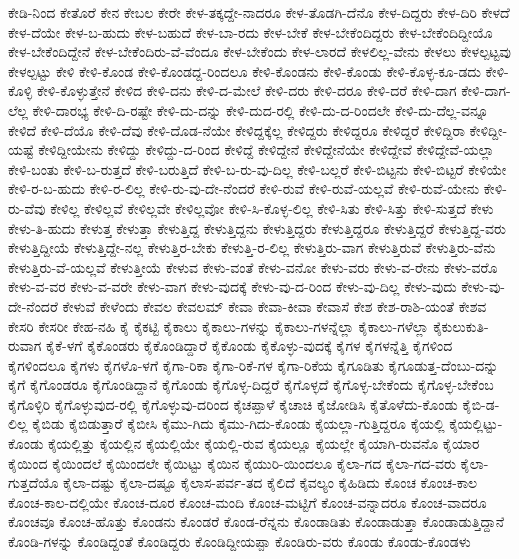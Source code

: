 {ಕೇಡಿ-ನಿಂದ
ಕೇತೊರೆ
ಕೇನ
ಕೇಬಲ
ಕೇರೇ
ಕೇಳ-ತಕ್ಕದ್ದೇ-ನಾದರೂ
ಕೇಳ-ತೊಡಗಿ-ದೆನೊ
ಕೇಳ-ದಿದ್ದರು
ಕೇಳ-ದಿರಿ
ಕೇಳದೆ
ಕೇಳ-ದೆಯೇ
ಕೇಳ-ಬ-ಹುದು
ಕೇಳ-ಬಹುದೆ
ಕೇಳ-ಬಾ-ರದು
ಕೇಳ-ಬೇಕೆ
ಕೇಳ-ಬೇಕೆಂದಿದ್ದರು
ಕೇಳ-ಬೇಕೆಂದಿದ್ದೀಯೊ
ಕೇಳ-ಬೇಕೆಂದಿದ್ದೇನೆ
ಕೇಳ-ಬೇಕೆಂದಿರು-ವೆ-ವೆಂದೂ
ಕೇಳ-ಬೇಕೆಂದು
ಕೇಳ-ಲಾರದೆ
ಕೇಳಲಿಲ್ಲ-ವೇನು
ಕೇಳಲು
ಕೇಳಲ್ಪಟ್ಟವು
ಕೇಳಲ್ಪಟ್ಟು
ಕೇಳಿ
ಕೇಳಿ-ಕೊಂಡ
ಕೇಳಿ-ಕೊಂಡದ್ದ-ರಿಂದಲೂ
ಕೇಳಿ-ಕೊಂಡನು
ಕೇಳಿ-ಕೊಂಡು
ಕೇಳಿ-ಕೊಳ್ಳ-ಕೂ-ಡದು
ಕೇಳಿ-ಕೊಳ್ಳಿ
ಕೇಳಿ-ಕೊಳ್ಳುತ್ತೇನೆ
ಕೇಳಿದ
ಕೇಳಿ-ದನು
ಕೇಳಿ-ದ-ಮೇಲೆ
ಕೇಳಿ-ದರು
ಕೇಳಿ-ದರೂ
ಕೇಳಿ-ದರೆ
ಕೇಳಿ-ದಾಗ
ಕೇಳಿ-ದಾಗ-ಲೆಲ್ಲ
ಕೇಳಿ-ದಾರಭ್ಯ
ಕೇಳಿ-ದಿ-ರಷ್ಟೇ
ಕೇಳಿ-ದು-ದನ್ನು
ಕೇಳಿ-ದುದ-ರಲ್ಲಿ
ಕೇಳಿ-ದು-ದ-ರಿಂದಲೇ
ಕೇಳಿ-ದು-ದೆಲ್ಲ-ವನ್ನೂ
ಕೇಳಿದೆ
ಕೇಳಿ-ದೆಯೊ
ಕೇಳಿ-ದೆವು
ಕೇಳಿ-ದೊಡ-ನೆಯೇ
ಕೇಳಿದ್ದಕ್ಕೆಲ್ಲ
ಕೇಳಿದ್ದರು
ಕೇಳಿದ್ದರೂ
ಕೇಳಿದ್ದರೆ
ಕೇಳಿದ್ದಿರಾ
ಕೇಳಿದ್ದೀ-ಯಷ್ಟೆ
ಕೇಳಿದ್ದೀಯೇನು
ಕೇಳಿದ್ದು
ಕೇಳಿದ್ದು-ದ-ರಿಂದ
ಕೇಳಿದ್ದೆ
ಕೇಳಿದ್ದೇನೆ
ಕೇಳಿದ್ದೇನೆಯೇ
ಕೇಳಿದ್ದೇವೆ
ಕೇಳಿದ್ದೇವೆ-ಯಲ್ಲಾ
ಕೇಳಿ-ಬಂತು
ಕೇಳಿ-ಬ-ರುತ್ತದೆ
ಕೇಳಿ-ಬರುತ್ತಿದೆ
ಕೇಳಿ-ಬ-ರು-ವು-ದಿಲ್ಲ
ಕೇಳಿ-ಬಲ್ಲರೆ
ಕೇಳಿ-ಬಿಟ್ಟನು
ಕೇಳಿ-ಬಿಟ್ಟರೆ
ಕೇಳಿಯೇ
ಕೇಳಿ-ರ-ಬ-ಹುದು
ಕೇಳಿ-ರ-ಲಿಲ್ಲ
ಕೇಳಿ-ರು-ವು-ದೇ-ನೆಂದರೆ
ಕೇಳಿ-ರುವೆ
ಕೇಳಿ-ರುವೆ-ಯಲ್ಲವೆ
ಕೇಳಿ-ರುವೆ-ಯೇನು
ಕೇಳಿ-ರು-ವೆವು
ಕೇಳಿಲ್ಲ
ಕೇಳಿಲ್ಲವೆ
ಕೇಳಿಲ್ಲವೇ
ಕೇಳಿಲ್ಲವೋ
ಕೇಳಿ-ಸಿ-ಕೊಳ್ಳ-ಲಿಲ್ಲ
ಕೇಳಿ-ಸಿತು
ಕೇಳಿ-ಸಿತ್ತು
ಕೇಳಿ-ಸುತ್ತದೆ
ಕೇಳು
ಕೇಳು-ತಿ-ಹುದು
ಕೇಳುತ್ತ
ಕೇಳುತ್ತಾ
ಕೇಳುತ್ತಿದ್ದ
ಕೇಳುತ್ತಿದ್ದನು
ಕೇಳುತ್ತಿದ್ದರು
ಕೇಳುತ್ತಿದ್ದರೂ
ಕೇಳುತ್ತಿದ್ದರೆ
ಕೇಳುತ್ತಿದ್ದ-ವರು
ಕೇಳುತ್ತಿದ್ದೀಯೆ
ಕೇಳುತ್ತಿದ್ದೇ-ನಲ್ಲ
ಕೇಳುತ್ತಿರ-ಬೇಕು
ಕೇಳುತ್ತಿ-ರ-ಲಿಲ್ಲ
ಕೇಳುತ್ತಿರು-ವಾಗ
ಕೇಳುತ್ತಿರುವೆ
ಕೇಳುತ್ತಿರು-ವೆನು
ಕೇಳುತ್ತಿರು-ವೆ-ಯಲ್ಲವೆ
ಕೇಳುತ್ತೀಯೆ
ಕೇಳುವ
ಕೇಳು-ವಂತೆ
ಕೇಳು-ವನೋ
ಕೇಳು-ವರು
ಕೇಳು-ವ-ರೇನು
ಕೇಳು-ವರೊ
ಕೇಳು-ವ-ವರ
ಕೇಳು-ವ-ವರೇ
ಕೇಳು-ವಾಗ
ಕೇಳು-ವುದಕ್ಕೆ
ಕೇಳು-ವು-ದ-ರಿಂದ
ಕೇಳು-ವು-ದಿಲ್ಲ
ಕೇಳು-ವುದು
ಕೇಳು-ವು-ದೇ-ನೆಂದರೆ
ಕೇಳುವೆ
ಕೇಳೆಂದು
ಕೇವಲ
ಕೇವಲಮ್
ಕೇವಾ
ಕೇವಾ-ಕೀವಾ
ಕೇವಾಸೆ
ಕೇಶ
ಕೇಶ-ರಾಶಿ-ಯಂತೆ
ಕೇಶವ
ಕೇಸರಿ
ಕೇಸರೀ
ಕೇಹ-ನಹಿ
ಕೈ
ಕೈಕಟ್ಟಿ
ಕೈಕಾಲು
ಕೈಕಾಲು-ಗಳನ್ನು
ಕೈಕಾಲು-ಗಳನ್ನೆಲ್ಲಾ
ಕೈಕಾಲು-ಗಳೆಲ್ಲಾ
ಕೈಕುಲುಕುತಿ-ರುವಾಗ
ಕೈಕೆ-ಳಗೆ
ಕೈಕೊಂಡರು
ಕೈಕೊಂಡಿದ್ದಾರೆ
ಕೈಕೊಂಡು
ಕೈಕೊಳ್ಳು-ವುದಕ್ಕೆ
ಕೈಗಳ
ಕೈಗಳನ್ನೆತ್ತಿ
ಕೈಗಳಿಂದ
ಕೈಗಳಿಂದಲೂ
ಕೈಗಳು
ಕೈಗಳೊ-ಳಗೆ
ಕೈಗಾ-ರಿಕಾ
ಕೈಗಾ-ರಿಕೆ-ಗಳ
ಕೈಗಾ-ರಿಕೆಯ
ಕೈಗೂಡಿತು
ಕೈಗೂಡುತ್ತ-ದೆಂಬು-ದನ್ನು
ಕೈಗೆ
ಕೈಗೊಂಡರೂ
ಕೈಗೊಂಡಿದ್ದಾನೆ
ಕೈಗೊಂಡು
ಕೈಗೊಳ್ಳ-ದಿದ್ದರೆ
ಕೈಗೊಳ್ಳದೆ
ಕೈಗೊಳ್ಳ-ಬೇಕೆಂದು
ಕೈಗೊಳ್ಳ-ಬೇಕೆಂಬ
ಕೈಗೊಳ್ಳಿರಿ
ಕೈಗೊಳ್ಳುವುದ-ರಲ್ಲಿ
ಕೈಗೊಳ್ಳುವು-ದರಿಂದ
ಕೈಚಪ್ಪಾಳೆ
ಕೈಚಾಚಿ
ಕೈಜೋಡಿಸಿ
ಕೈತೊಳೆದು-ಕೊಂಡು
ಕೈಬಿ-ಡ-ಲಿಲ್ಲ
ಕೈಬಿಡು
ಕೈಬಿಡುತ್ತಾರೆ
ಕೈಬೀಸಿ
ಕೈಮು-ಗಿದು
ಕೈಮು-ಗಿದು-ಕೊಂಡು
ಕೈಯಲ್ಲಾ-ಗುತ್ತಿದ್ದರೂ
ಕೈಯಲ್ಲಿ
ಕೈಯಲ್ಲಿಟ್ಟು-ಕೊಂಡು
ಕೈಯಲ್ಲಿತ್ತು
ಕೈಯಲ್ಲಿನ
ಕೈಯಲ್ಲಿಯೇ
ಕೈಯಲ್ಲಿ-ರುವ
ಕೈಯಲ್ಲೂ
ಕೈಯಲ್ಲೇ
ಕೈಯಾಗಿ-ರುವನೊ
ಕೈಯಾರ
ಕೈಯಿಂದ
ಕೈಯಿಂದಲೆ
ಕೈಯಿಂದಲೇ
ಕೈಯಿಟ್ಟು
ಕೈಯಿನ
ಕೈಯುರಿ-ಯಿಂದಲೂ
ಕೈಲಾ-ಗದ
ಕೈಲಾ-ಗದ-ವರು
ಕೈಲಾ-ಗುತ್ತದೆಯೊ
ಕೈಲಾ-ದಷ್ಟು
ಕೈಲಾ-ದಷ್ಟೂ
ಕೈಲಾಸ-ಪರ್ವ-ತದ
ಕೈಲಿದೆ
ಕೈವಲ್ಯಂ
ಕೈಹಿಡಿದು
ಕೊಂಚ
ಕೊಂಚ-ಕಾಲ
ಕೊಂಚ-ಕಾಲ-ದಲ್ಲಿಯೇ
ಕೊಂಚ-ದೂರ
ಕೊಂಚ-ಮಂದಿ
ಕೊಂಚ-ಮಟ್ಟಿಗೆ
ಕೊಂಚ-ವನ್ನಾದರೂ
ಕೊಂಚ-ವಾದರೂ
ಕೊಂಚವೂ
ಕೊಂಚ-ಹೊತ್ತು
ಕೊಂಡನು
ಕೊಂಡರೆ
ಕೊಂಡ-ರೆನ್ನನು
ಕೊಂಡಾಡಿತು
ಕೊಂಡಾಡುತ್ತಾ
ಕೊಂಡಾಡುತ್ತಿದ್ದಾನೆ
ಕೊಂಡಿ-ಗಳನ್ನು
ಕೊಂಡಿದ್ದಂತೆ
ಕೊಂಡಿದ್ದರು
ಕೊಂಡಿದ್ದೀಯಪ್ಪಾ
ಕೊಂಡಿರು-ವರು
ಕೊಂಡು
ಕೊಂಡು-ಕೊಂಡಳು
}
